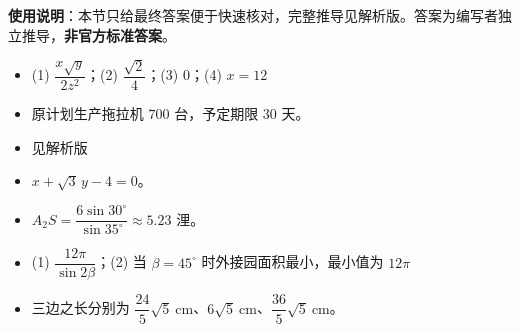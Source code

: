 
\begin{gknotice}
\textbf{使用说明}：本节只给最终答案便于快速核对，完整推导见解析版。答案为编写者独立推导，\textbf{非官方标准答案}。
\end{gknotice}

\begin{itemize}[leftmargin=2.6em]
  \item[\textbf{1.}] (1) $\dfrac{x\sqrt y}{2z^{2}}$；(2) $\dfrac{\sqrt2}{4}$；(3) $0$；(4) $x=12$
  \item[\textbf{2.}] 原计划生产拖拉机 $700$ 台，予定期限 $30$ 天。
  \item[\textbf{3.}] 见解析版
  \item[\textbf{4.}] $x+\sqrt3\,y-4=0$。
  \item[\textbf{5.}] $A_2S=\dfrac{6\sin30^\circ}{\sin35^\circ}\approx5.23$ 浬。
  \item[\textbf{6.}] (1) $\dfrac{12\pi}{\sin2\beta}$；(2) 当 $\beta=45^\circ$ 时外接园面积最小，最小值为 $12\pi$
  \item[\textbf{7.}] 三边之长分别为 $\dfrac{24}{5}\sqrt5\ \mathrm{cm}$、$6\sqrt5\ \mathrm{cm}$、$\dfrac{36}{5}\sqrt5\ \mathrm{cm}$。
\end{itemize}
